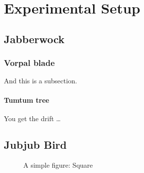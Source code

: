 %

\chapter{Experimental Setup}
\section{Jabberwock}
\subsection{Vorpal blade}
And this is a subsection.
	
\subsubsection{Tumtum tree}
You get the drift \ldots
		
\section{Jubjub Bird}

\begin{figure}[htbp]			%
\begin{center}
\caption{A simple figure: Square}	%
\label{circle}
\end{center}
\end{figure}


